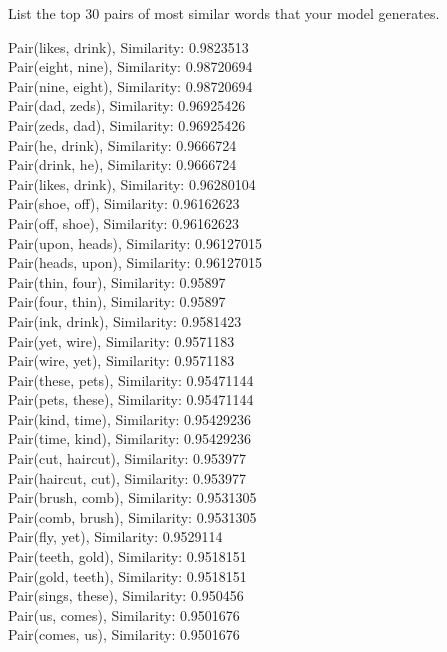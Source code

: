 \problem[1]
List the top 30 pairs of most similar words that your model generates.
\begin{solution}

	Pair(likes, drink), Similarity: 0.9823513 \\
	Pair(eight, nine), Similarity: 0.98720694 \\
	Pair(nine, eight), Similarity: 0.98720694 \\
	Pair(dad, zeds), Similarity: 0.96925426 \\
	Pair(zeds, dad), Similarity: 0.96925426 \\
	Pair(he, drink), Similarity: 0.9666724 \\
	Pair(drink, he), Similarity: 0.9666724 \\
	Pair(likes, drink), Similarity: 0.96280104 \\
	Pair(shoe, off), Similarity: 0.96162623 \\
	Pair(off, shoe), Similarity: 0.96162623 \\
	Pair(upon, heads), Similarity: 0.96127015 \\
	Pair(heads, upon), Similarity: 0.96127015 \\
	Pair(thin, four), Similarity: 0.95897 \\
	Pair(four, thin), Similarity: 0.95897 \\
	Pair(ink, drink), Similarity: 0.9581423 \\
	Pair(yet, wire), Similarity: 0.9571183 \\
	Pair(wire, yet), Similarity: 0.9571183 \\
	Pair(these, pets), Similarity: 0.95471144 \\
	Pair(pets, these), Similarity: 0.95471144 \\
	Pair(kind, time), Similarity: 0.95429236 \\
	Pair(time, kind), Similarity: 0.95429236 \\
	Pair(cut, haircut), Similarity: 0.953977 \\
	Pair(haircut, cut), Similarity: 0.953977 \\
	Pair(brush, comb), Similarity: 0.9531305 \\
	Pair(comb, brush), Similarity: 0.9531305 \\
	Pair(fly, yet), Similarity: 0.9529114 \\
	Pair(teeth, gold), Similarity: 0.9518151 \\
	Pair(gold, teeth), Similarity: 0.9518151 \\
	Pair(sings, these), Similarity: 0.950456 \\
	Pair(us, comes), Similarity: 0.9501676 \\
	Pair(comes, us), Similarity: 0.9501676 \\
\end{solution}

